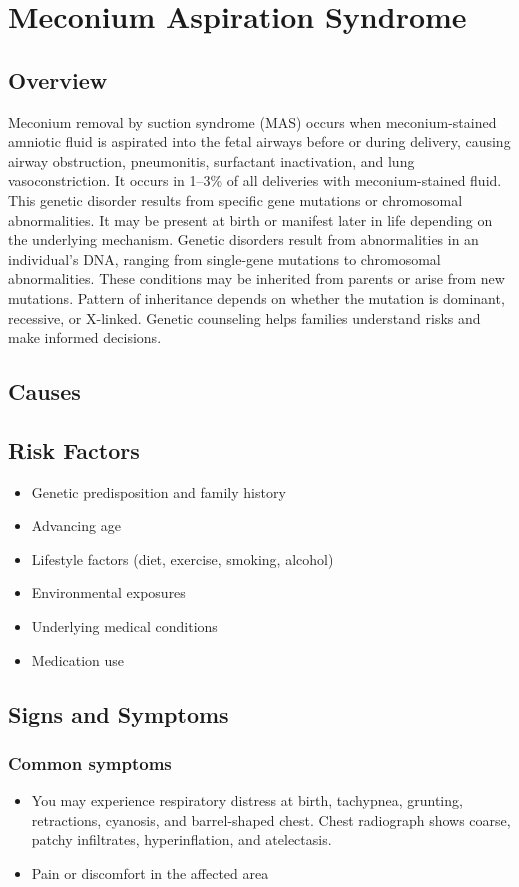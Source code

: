 \chapter{Meconium Aspiration Syndrome}
\label{sec:Meconium Aspiration Syndrome}

\section{Overview}
Meconium removal by suction syndrome (MAS) occurs when meconium-stained amniotic fluid is aspirated into the fetal airways before or during delivery, causing airway obstruction, pneumonitis, surfactant inactivation, and lung vasoconstriction. It occurs in 1--3\% of all deliveries with meconium-stained fluid. This genetic disorder results from specific gene mutations or chromosomal abnormalities. It may be present at birth or manifest later in life depending on the underlying mechanism. Genetic disorders result from abnormalities in an individual's DNA, ranging from single-gene mutations to chromosomal abnormalities. These conditions may be inherited from parents or arise from new mutations. Pattern of inheritance depends on whether the mutation is dominant, recessive, or X-linked. Genetic counseling helps families understand risks and make informed decisions.
\section{Causes}
\section{Risk Factors}

\begin{itemize}[noitemsep]
  \item Genetic predisposition and family history
  \item Advancing age
  \item Lifestyle factors (diet, exercise, smoking, alcohol)
  \item Environmental exposures
  \item Underlying medical conditions
  \item Medication use
\end{itemize}
\section{Signs and Symptoms}

\subsection{Common symptoms}
\begin{itemize}[noitemsep]
  \item You may experience respiratory distress at birth, tachypnea, grunting, retractions, cyanosis, and barrel-shaped chest. Chest radiograph shows coarse, patchy infiltrates, hyperinflation, and atelectasis.

  \item Pain or discomfort in the affected area
  \end{itemize}

